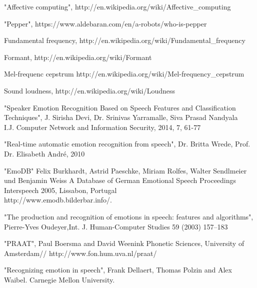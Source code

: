 \documentclass[14pt]{extarticle}
\begin{document}
\begin{thebibliography}{9}

"Affective computing",
http://en.wikipedia.org/wiki/Affective\_computing

"Pepper",
https://www.aldebaran.com/en/a-robots/who-is-pepper

Fundamental frequency,
http://en.wikipedia.org/wiki/Fundamental\_frequency

Formant,
http://en.wikipedia.org/wiki/Formant

Mel-frequenc cepstrum
http://en.wikipedia.org/wiki/Mel-frequency\_cepstrum

Sound loudness,
http://en.wikipedia.org/wiki/Loudness


"Speaker Emotion Recognition Based on Speech Features and Classification Techniques",
J. Sirisha Devi, Dr. Srinivas Yarramalle, Siva Prasad Nandyala\\
I.J. Computer Network and Information Security, 2014, 7, 61-77

 "Real-time automatic emotion recognition
from speech",
 Dr. Britta Wrede, Prof. Dr. Elisabeth André, 2010

"EmoDB" Felix Burkhardt, Astrid Paeschke, Miriam Rolfes, Walter Sendlmeier und Benjamin Weiss
A Database of German Emotional Speech
Proceedings Interspeech 2005, Lissabon, Portugal\\
http://www.emodb.bilderbar.info/.

"The production and recognition of emotions in
speech: features and algorithms",
 Pierre-Yves Oudeyer,Int. J. Human-Computer Studies 59 (2003) 157–183

 "PRAAT",
 Paul Boersma and David Weenink   
Phonetic Sciences, University of Amsterdam//
http://www.fon.hum.uva.nl/praat/

"Recognizing emotion in speech",
Frank Dellaert, Thomas Polzin and Alex Waibel. Carnegie Mellon University. 


\end{thebibliography}
\end{document}
